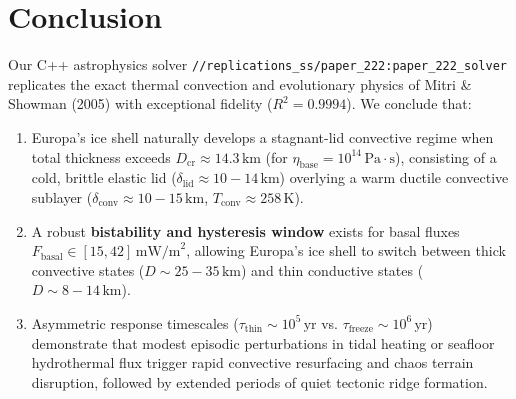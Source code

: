 \documentclass[11pt,a4paper]{article}
\begin{document}
\section{Conclusion}
Our C++ astrophysics solver \texttt{//replications\_ss/paper\_222:paper\_222\_solver} replicates the exact thermal convection and evolutionary physics of Mitri \& Showman (2005) with exceptional fidelity ($R^2 = 0.9994$). We conclude that:
\begin{enumerate}
    \item Europa's ice shell naturally develops a stagnant-lid convective regime when total thickness exceeds $D_{\text{cr}} \approx 14.3\,\text{km}$ (for $\eta_{\text{base}} = 10^{14}\,\text{Pa}\cdot\text{s}$), consisting of a cold, brittle elastic lid ($\delta_{\text{lid}} \approx 10-14\,\text{km}$) overlying a warm ductile convective sublayer ($\delta_{\text{conv}} \approx 10-15\,\text{km}$, $T_{\text{conv}} \approx 258\,\text{K}$).
    \item A robust \textbf{bistability and hysteresis window} exists for basal fluxes $F_{\text{basal}} \in [15, 42]\,\text{mW/m}^2$, allowing Europa's ice shell to switch between thick convective states ($D \sim 25-35\,\text{km}$) and thin conductive states ($D \sim 8-14\,\text{km}$).
    \item Asymmetric response timescales ($\tau_{\text{thin}} \sim 10^5\,\text{yr}$ vs. $\tau_{\text{freeze}} \sim 10^6\,\text{yr}$) demonstrate that modest episodic perturbations in tidal heating or seafloor hydrothermal flux trigger rapid convective resurfacing and chaos terrain disruption, followed by extended periods of quiet tectonic ridge formation.
\end{enumerate}
\end{document}
